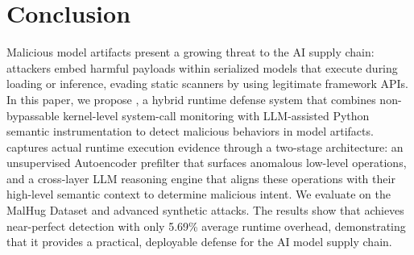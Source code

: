 \section{Conclusion}\label{sec:conclusion}

Malicious model artifacts present a growing threat to the AI supply chain: attackers embed harmful payloads within serialized models that execute during loading or inference, evading static scanners by using legitimate framework APIs. In this paper, we propose \toolname{}, a hybrid runtime defense system that combines non-bypassable kernel-level system-call monitoring with LLM-assisted Python semantic instrumentation to detect malicious behaviors in model artifacts. \toolname{} captures actual runtime execution evidence through a two-stage architecture: an unsupervised Autoencoder prefilter that surfaces anomalous low-level operations, and a cross-layer LLM reasoning engine that aligns these operations with their high-level semantic context to determine malicious intent. We evaluate \toolname{} on the MalHug Dataset and advanced synthetic attacks. The results show that \toolname{} achieves near-perfect detection with only 5.69\% average runtime overhead, demonstrating that it provides a practical, deployable defense for the AI model supply chain.